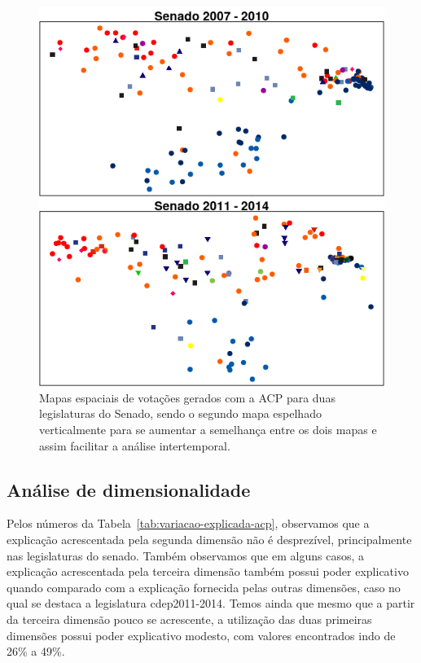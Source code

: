 \documentclass[a4paper, 12pt]{article}
\begin{document}
\begin{figure}[h!]
  \centering
  \includegraphics[scale=0.7]{figs/sen-rotacao.png}
  \caption{Mapas espaciais de votações gerados com a ACP para duas legislaturas do Senado, sendo o segundo mapa espelhado verticalmente para se aumentar a semelhança entre os dois mapas e assim facilitar a análise intertemporal.}
  \label{fig:sen-rotacao}
\end{figure}

\subsection*{Análise de dimensionalidade}

Pelos números da Tabela~\ref{tab:variacao-explicada-acp}, observamos que a explicação acrescentada pela segunda dimensão não é desprezível, principalmente nas legislaturas do senado. Também observamos que em alguns casos, a explicação acrescentada pela terceira dimensão também possui poder explicativo quando comparado com a explicação fornecida pelas outras dimensões, caso no qual se destaca a legislatura cdep2011-2014. Temos ainda que mesmo que a partir da terceira dimensão pouco se acrescente, a utilização das duas primeiras dimensões possui poder explicativo modesto, com valores encontrados indo de 26\% a 49\%. 
\end{document}
